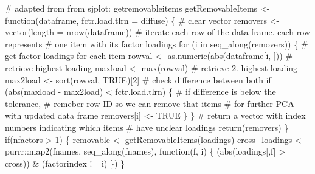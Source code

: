 \documentclass[
  12pt,
]{article}
\newenvironment{Shaded}{\begin{snugshade}}{\end{snugshade}}
\newcommand{\AttributeTok}[1]{\textcolor[rgb]{0.40,0.45,0.13}{#1}}
\newcommand{\CommentTok}[1]{\textcolor[rgb]{0.37,0.37,0.37}{#1}}
\newcommand{\ConstantTok}[1]{\textcolor[rgb]{0.56,0.35,0.01}{#1}}
\newcommand{\ControlFlowTok}[1]{\textcolor[rgb]{0.00,0.23,0.31}{#1}}
\newcommand{\DecValTok}[1]{\textcolor[rgb]{0.68,0.00,0.00}{#1}}
\newcommand{\FunctionTok}[1]{\textcolor[rgb]{0.28,0.35,0.67}{#1}}
\newcommand{\NormalTok}[1]{\textcolor[rgb]{0.00,0.23,0.31}{#1}}
\newcommand{\OtherTok}[1]{\textcolor[rgb]{0.00,0.23,0.31}{#1}}
\newcommand{\SpecialCharTok}[1]{\textcolor[rgb]{0.37,0.37,0.37}{#1}}
\begin{document}
\begin{Shaded}
\begin{Highlighting}[]
  \CommentTok{\# adapted from from sjplot: getremovableitems}
\NormalTok{  getRemovableItems }\OtherTok{\textless{}{-}} \ControlFlowTok{function}\NormalTok{(dataframe, }\AttributeTok{fctr.load.tlrn =}\NormalTok{ diffuse) \{}
    \CommentTok{\# clear vector}
\NormalTok{    removers }\OtherTok{\textless{}{-}} \FunctionTok{vector}\NormalTok{(}\AttributeTok{length =} \FunctionTok{nrow}\NormalTok{(dataframe))}
    \CommentTok{\# iterate each row of the data frame. each row represents}
    \CommentTok{\# one item with its factor loadings}
    \ControlFlowTok{for}\NormalTok{ (i }\ControlFlowTok{in} \FunctionTok{seq\_along}\NormalTok{(removers)) \{}
      \CommentTok{\# get factor loadings for each item}
\NormalTok{      rowval }\OtherTok{\textless{}{-}} \FunctionTok{as.numeric}\NormalTok{(}\FunctionTok{abs}\NormalTok{(dataframe[i, ]))}
      \CommentTok{\# retrieve highest loading}
\NormalTok{      maxload }\OtherTok{\textless{}{-}} \FunctionTok{max}\NormalTok{(rowval)}
      \CommentTok{\# retrieve 2. highest loading}
\NormalTok{      max2load }\OtherTok{\textless{}{-}} \FunctionTok{sort}\NormalTok{(rowval, }\ConstantTok{TRUE}\NormalTok{)[}\DecValTok{2}\NormalTok{]}
      \CommentTok{\# check difference between both}
      \ControlFlowTok{if}\NormalTok{ (}\FunctionTok{abs}\NormalTok{(maxload }\SpecialCharTok{{-}}\NormalTok{ max2load) }\SpecialCharTok{\textless{}}\NormalTok{ fctr.load.tlrn) \{}
        \CommentTok{\# if difference is below the tolerance,}
        \CommentTok{\# remeber row{-}ID so we can remove that items}
        \CommentTok{\# for further PCA with updated data frame}
\NormalTok{        removers[i] }\OtherTok{\textless{}{-}} \ConstantTok{TRUE}
\NormalTok{      \}}
\NormalTok{    \}}
    \CommentTok{\# return a vector with index numbers indicating which items}
    \CommentTok{\# have unclear loadings}
    \FunctionTok{return}\NormalTok{(removers)}
\NormalTok{  \}}
  \ControlFlowTok{if}\NormalTok{(nfactors }\SpecialCharTok{\textgreater{}} \DecValTok{1}\NormalTok{) \{}
\NormalTok{    removable }\OtherTok{\textless{}{-}} \FunctionTok{getRemovableItems}\NormalTok{(loadings)}
\NormalTok{    cross\_loadings }\OtherTok{\textless{}{-}}\NormalTok{ purrr}\SpecialCharTok{::}\FunctionTok{map2}\NormalTok{(fnames, }\FunctionTok{seq\_along}\NormalTok{(fnames), }\ControlFlowTok{function}\NormalTok{(f, i) \{}
\NormalTok{      (}\FunctionTok{abs}\NormalTok{(loadings[,f] }\SpecialCharTok{\textgreater{}}\NormalTok{ cross)) }\SpecialCharTok{\&}\NormalTok{ (factorindex }\SpecialCharTok{!=}\NormalTok{ i) }
\NormalTok{    \})}
\NormalTok{  \}}
  

\end{Highlighting}
\end{Shaded}
\end{document}
